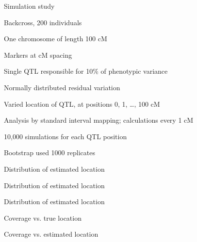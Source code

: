 \documentclass[aspectratio=169,12pt,t]{beamer}
\begin{document}
\begin{frame}{Simulation study}


  \vspace*{-5mm}

  \bbi
\item {\hilit Backcross}, 200 individuals

\item One chromosome of length 100 cM

\item Markers at { cM spacing}

\item {\hilit Single QTL} responsible for 10\% of phenotypic variance

\item Normally distributed residual variation

\item {\hilit Varied location of QTL}, at positions 0, 1, \dots, 100 cM

\item Analysis by standard interval mapping;
  calculations every 1 cM

\item 10,000 simulations for each QTL position

\item Bootstrap used 1000 replicates
\ei

\note{
}
\end{frame}


\begin{frame}[c]{Distribution of estimated location}


\note{
}
\end{frame}




\begin{frame}[c]{Distribution of estimated location}


\note{
}
\end{frame}




\begin{frame}[c]{Distribution of estimated location}


\note{
}
\end{frame}



\begin{frame}[c]{Coverage vs. true location}


\note{
}
\end{frame}





\begin{frame}[c]{Coverage vs. estimated location}


\note{
}
\end{frame}
\end{document}

